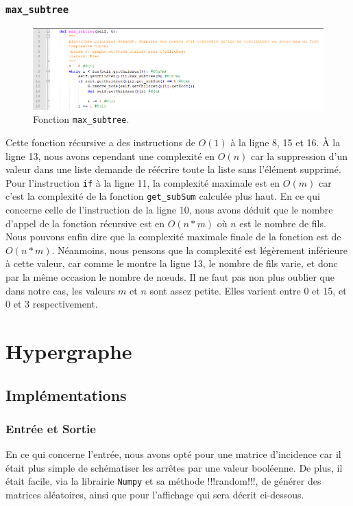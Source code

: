 \documentclass[a4papper]{article}
\begin{document}
		\subsubsection{\texttt{max\_subtree}}
			\begin{figure}[h!]
				\centering
				\includegraphics[width=\linewidth]{max_subtree.png}
				\caption{Fonction \texttt{max\_subtree}.}
			\end{figure}
			
			Cette fonction récursive a des instructions de $O(1)$ à la ligne 8, 15 et 16. À la ligne 13, nous avons cependant une complexité en $O(n)$ car la suppression d'un valeur dans une liste demande de réécrire toute la liste sans l'élément supprimé. Pour l'instruction \texttt{if} à la ligne 11, la complexité maximale est en $O(m)$ car c'est la complexité de la fonction \texttt{get\_subSum} calculée plus haut. En ce qui concerne celle de l'instruction de la ligne 10, nous avons déduit que le nombre d'appel de la fonction récursive est en $O(n*m)$ où $n$ est le nombre de fils.\\
			
			Nous pouvons enfin dire que la complexité maximale finale de la fonction est de $O(n*m)$. Néanmoins, nous pensons que la complexité est légèrement inférieure à cette valeur, car comme le montre la ligne 13, le nombre de fils varie, et donc par la même occasion le nombre de nœuds. Il ne faut pas non plus oublier que dans notre cas, les valeurs $m$ et $n$ sont assez petite. Elles varient entre 0 et 15, et 0 et 3 respectivement.
\section{Hypergraphe}
	\subsection{Implémentations}
		\subsubsection{Entrée et Sortie}
			En ce qui concerne l'entrée, nous avons opté pour une matrice d'incidence car il était plus simple de schématiser les arrêtes par une valeur booléenne. De plus, il était facile, via la librairie \texttt{Numpy} et sa méthode !!!random!!!, de générer des matrices aléatoires, ainsi que pour l'affichage qui sera décrit ci-dessous.
\end{document}
